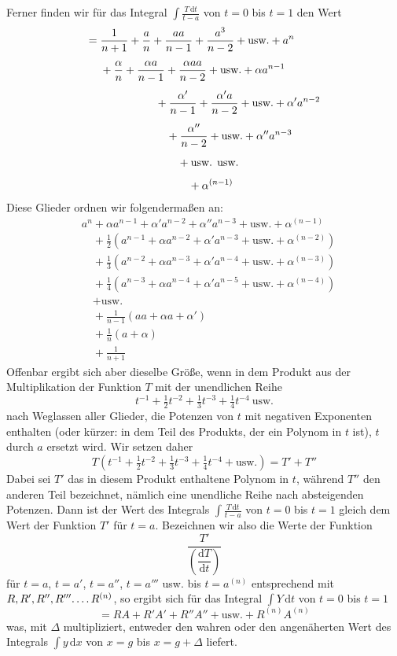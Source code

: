 Ferner finden wir für das Integral $\int\frac{T\,\mathrm{d}t}{t-a}$ von $t=0$ bis $t=1$ den Wert
\[
\begin{aligned}
={}&\frac{1}{n+1}+\frac{a}{n}+\frac{aa}{n-1}+\frac{a^3}{n-2}+\text{usw.}+a^n\\[4pt]
&+\frac{\alpha}{n}+\frac{\alpha a}{n-1}+\frac{\alpha aa}{n-2}+\text{usw.}+\alpha a^{n-1}\\[4pt]
&\hspace{5.01em}+\frac{\alpha'}{n-1}+\frac{\alpha'a}{n-2}+\text{usw.}+\alpha'a^{n-2}\\[4pt]
&\hspace{6.01em}+\frac{\alpha''}{n-2}+\text{usw.}+\alpha''a^{n-3}\\[4pt]
&\hspace{7.01em}+\text{usw. usw.}\\[4pt]
&\hspace{8.01em}+\alpha^{(n-1)}
\end{aligned}
\]
Diese Glieder ordnen wir folgendermaßen an:
\[
\begin{aligned}
&a^n+\alpha a^{n-1}+\alpha'a^{n-2}+\alpha''a^{n-3}+\text{usw.}+\alpha^{(n-1)}\\[4pt]
&\quad+\tfrac12(a^{n-1}+\alpha a^{n-2}+\alpha'a^{n-3}+\text{usw.}+\alpha^{(n-2)})\\[4pt]
&\quad+\tfrac13(a^{n-2}+\alpha a^{n-3}+\alpha'a^{n-4}+\text{usw.}+\alpha^{(n-3)})\\[4pt]
&\quad+\tfrac14(a^{n-3}+\alpha a^{n-4}+\alpha'a^{n-5}+\text{usw.}+\alpha^{(n-4)})\\[4pt]
&\quad+\text{usw.}\\[4pt]
&\quad+\frac{1}{n-1}(aa+\alpha a+\alpha')\\[4pt]
&\quad+\frac{1}{n}(a+\alpha)\\[4pt]
&\quad+\frac{1}{n+1}
\end{aligned}
\]
Offenbar ergibt sich aber dieselbe Größe, wenn in dem Produkt aus der Multiplikation der Funktion $T$ mit der unendlichen Reihe
\[
t^{-1}+\tfrac12t^{-2}+\tfrac13t^{-3}+\tfrac14t^{-4}\ \text{usw.}
\]
nach Weglassen aller Glieder, die Potenzen von $t$ mit negativen Exponenten enthalten (oder kürzer: in dem Teil des Produkts, der ein Polynom in $t$ ist), $t$ durch $a$ ersetzt wird. Wir setzen daher
\[
T(t^{-1}+\tfrac12t^{-2}+\tfrac13t^{-3}+\tfrac14t^{-4}+\text{usw.})=T'+T''
\]
Dabei sei $T'$ das in diesem Produkt enthaltene Polynom in $t$, während $T''$ den anderen Teil bezeichnet, nämlich eine unendliche Reihe nach absteigenden Potenzen. Dann ist der Wert des Integrals $\int\frac{T\,\mathrm{d}t}{t-a}$ von $t=0$ bis $t=1$ gleich dem Wert der Funktion $T'$ für $t=a$. Bezeichnen wir also die Werte der Funktion
\[
\frac{T'}{\left(\dfrac{\mathrm{d}T}{\mathrm{d}t}\right)}
\]
für $t=a$, $t=a'$, $t=a''$, $t=a'''$ usw. bis $t=a^{(n)}$ entsprechend mit $R,R',R'',R'''\ldotp\ldotp\ldotp\ldotp R^{(n)}$, so ergibt sich für das Integral $\int Y\,\mathrm{d}t$ von $t=0$ bis $t=1$
\[
=RA+R'A'+R''A''+\text{usw.}+R^{(n)}A^{(n)}
\]
was, mit $\Delta$ multipliziert, entweder den wahren oder den angenäherten Wert des Integrals $\int y\,\mathrm{d}x$ von $x=g$ bis $x=g+\Delta$ liefert.


